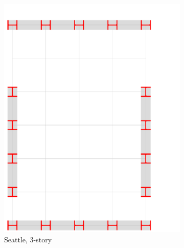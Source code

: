 \documentclass[onecolumn, fleqn]{article}
\begin{document}
\begin{figure}[H]
	\begin{subfigure}[b]{0.24\linewidth}
		\centering \includegraphics[page=1,trim=0mm 0mm 32mm 17mm,clip,scale=0.2]{moment_frames.pdf}
		\caption{Seattle, 3-story}
	\end{subfigure}
	\begin{subfigure}[b]{0.24\linewidth}

\end{subfigure}
\end{figure}
\end{document}
